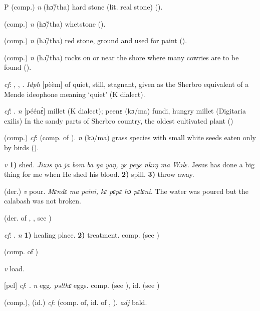 \begin{letter}{P}
 (comp.) \textit{n} (hɔ̃/tha) hard stone (lit. real stone) (\citealt{Pichl1967}).

 (comp.) \textit{n} (hɔ̃/tha) whetstone (\citealt{Pichl1967}).

 (comp.) \textit{n} (hɔ̃/tha) red stone, ground and used for paint (\citealt{Pichl1967}). 

 (comp.) \textit{n} (hɔ̃/tha) rocks on or near the shore where many cowries are to be found (\citealt{Pichl1967}). 

 \textit{cf}: , , . \textit{Idph} [pèèm] of quiet, still, stagnant, given as the Sherbro equivalent of a Mende ideophone meaning ‘quiet' (K dialect). 

 \textit{cf}: . \textit{n} [péénɛ̀] millet (K dialect); peenɛ (kɔ/ma) fundi, hungry millet (Digitaria exilis) In the sandy parts of Sherbro country, the oldest cultivated plant (\citealt{Pichl1967})

 (comp.) \textit{cf}:  (comp. of ). \textit{n} (kɔ/ma) grass species with small white seeds eaten only by birds (\citealt{Pichl1967}). 

 \textit{v} \textbf{1)} shed. \textit{Jizɔs ŋa ja bom ba ŋa yaŋ, yɛ peyɛ nkɔŋ ma Wɔlɛ.} Jesus has done a big thing for me when He shed his blood. \textbf{2)} spill. \textbf{3)} throw away.

 (der.) \textit{v} pour. \textit{Mɛndɛ ma peini, kɛ pɛpɛ hɔ pɛlɛni.} The water was poured but the calabash was not broken.

 (der. of , , see ) 

 \textit{cf}: . \textit{n} \textbf{1)} healing place. \textbf{2)} treatment. comp.  (see ) 

 (comp. of ) 

 \textit{v} load.

 [pel] \textit{cf}: . \textit{n} egg. \textit{pəlthɛ} eggs. comp.  (see ), id.  (see ) 

 (comp.), (id.) \textit{cf}:  (comp. of, id. of , ). \textit{adj} bald.


\end{letter}
